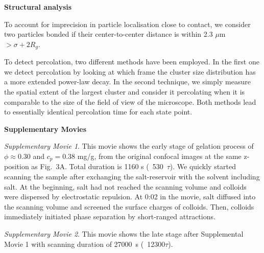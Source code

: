 \documentclass[12pt,onecolumn]{revtex4}
\begin{document}
\noindent
{\bf Structural analysis}

To account for imprecision in particle localisation close to contact, we consider two particles bonded if their center-to-center distance is within 2.3 $\mu$m $>\sigma+2R_g$.

To detect percolation, two different methods have been employed. In the first one we detect percolation
by looking at which frame the cluster size distribution has a more extended power-law decay. In the second technique,
we simply measure the spatial extent of the largest cluster and consider it percolating when it is comparable to the
size of the field of view of the microscope. Both methods lead to essentially identical percolation time for each state point.


\noindent
{\bf Supplementary Movies}

\emph{Supplementary Movie 1}. This movie shows the early stage of gelation process of $\phi\approx 0.30$ and $c_p=0.38$ mg/g, from the original confocal images at the same z-position as Fig.~3A. Total duration is 1160 s (~530~$\tau$). We quickly started scanning the sample after exchanging the salt-reservoir with the solvent including salt. At the beginning, salt had not reached the scanning volume and colloids were dispersed by electrostatic repulsion. At 0:02 in the movie, salt diffused into the scanning volume and screened the surface charges of colloids. Then, colloids immediately initiated phase separation by short-ranged attractions.



\emph{Supplementary Movie 2}.
This movie shows the late stage after Supplemental Movie 1 with scanning duration of 27000~s (~12300$\tau$).




%


\end{document}
